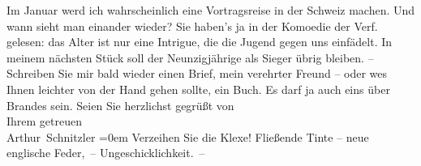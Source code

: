 \begin{ledgroupsized}[t]{13cm}
           \pstart
           Im Januar werd ich wahrscheinlich eine Vortragsreise in der Schweiz machen. Und wann sieht man einander wieder?
               Sie haben's ja in der Komoedie der Verf. gelesen:
               das Alter ist nur eine Intrigue, die die Jugend gegen uns einfädelt. In meinem
               nächsten Stück soll der
               Neunzigjährige als Sieger übrig bleiben.\pend
           \pstart
           {\pb}– Schreiben Sie mir bald wieder einen Brief, mein
               verehrter Freund – oder we{\geminationn}s Ihnen leichter von der Hand
               gehen sollte, ein Buch. Es darf ja auch eins über Brandes sein.\pend
           \pstart
           Seien Sie herzlichst gegrüßt von{\\[\baselineskip]}Ihrem getreuen{\\[\baselineskip]}\spacefill\mbox{Arthur Schnitzler}\pend
           \leftskip=0em{}\pstart
           \noindent{}Verzeihen Sie die Klexe! Fließende Tinte – neue englische Feder, – Ungeschicklichkeit. –\pend
           \endnumbering{}\end{ledgroupsized}  \newcommand{\dateiname}{L02423}\newcommand{\titel}{Arthur Schnitzler an Georg Brandes, 14. 12. 1924}\newcommand{\editorInnen}{Martin Anton Müller und Gerd-Hermann Susen}
      